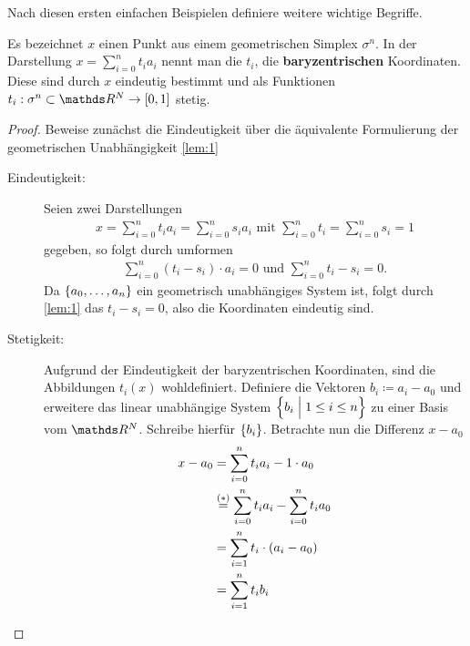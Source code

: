
Nach diesen ersten einfachen Beispielen definiere weitere wichtige
Begriffe.

\begin{Lem}\label{lem:bary}
  \normalfont Es bezeichnet $x$ einen Punkt aus einem geometrischen
  Simplex $\sigma^n$. In der Darstellung
  $x = \sum\limits_{i=0}^n t_i a_i$ nennt man die $t_i$, die
  \textbf{baryzentrischen} Koordinaten. Diese sind durch $x$ eindeutig
  bestimmt und als Funktionen
  $t_i : \sigma^n \subset \R^N \rightarrow [0,1]$ stetig.
  \begin{proof}
    Beweise zunächst die Eindeutigkeit über die äquivalente
    Formulierung der geometrischen Unabhängigkeit \cref{lem:1}
    \begin{description}
    \item[Eindeutigkeit: ] Seien zwei Darstellungen
      \begin{gather*}
        x = \sum\limits_{i=0}^n t_i a_i = \sum\limits_{i=0}^n s_i a_i
        \text{ mit } \sum\limits_{i=0}^n t_i = \sum\limits_{i=0}^n s_i
        = 1
      \end{gather*}
      gegeben, so folgt durch umformen
      \begin{gather*}
        \sum\limits_{i=0}^n (t_i - s_i ) \cdot a_i = 0 \text{ und }
        \sum\limits_{i=0}^n t_i - s_i = 0.
      \end{gather*}
      Da $\left\{ a_0 , \ldots , a_n \right\}$ ein geometrisch unabhängiges
      System ist, folgt durch \cref{lem:1} das $t_i - s_i = 0$, also
      die Koordinaten eindeutig sind.
    \item[Stetigkeit: ] Aufgrund der Eindeutigkeit der baryzentrischen
      Koordinaten, sind die Abbildungen $t_i (x)$ wohldefiniert.
      Definiere die Vektoren $b_i \coloneqq a_i - a_0$ und erweitere
      das linear unabhängige System $\left\{  b_i  \; \Big| \;  1 \leq i \leq n \right\}$ zu
      einer Basis vom $\R^N$. Schreibe hierfür $\left\{  b_i
       \right\}$. Betrachte nun die Differenz $x - a_0$
      \begin{align*}
        x - a_0 &= \sp{0}{n} t_i a_i - 1 \cdot a_0\\
                &\overset{(*)}{=} \sp{0}{n} t_i a_i - \sp{0}{n} t_i a_0\\
                &= \sp{1}{n} t_i \cdot (a_i - a_0)\\
                &= \sp{1}{n} t_i b_i\\

\end{align*}
\end{description}
\end{proof}
\end{Lem}
